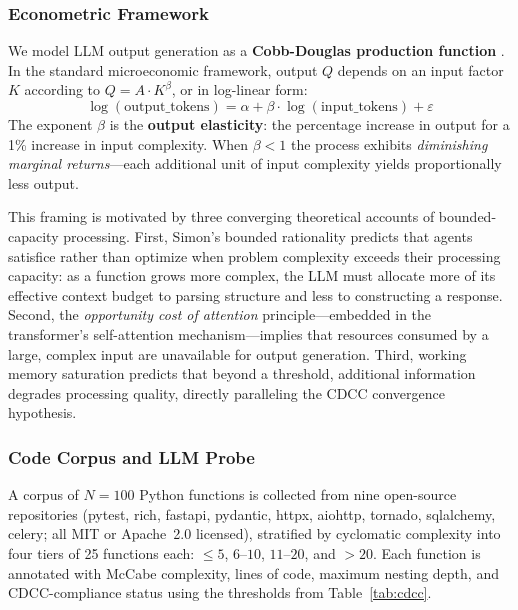 \documentclass[11pt,a4paper]{article}
\begin{document}
\subsubsection{Econometric Framework}

We model LLM output generation as a \textbf{Cobb-Douglas production function}
\citep{varian1992}. In the standard microeconomic framework, output $Q$
depends on an input factor $K$ according to $Q = A \cdot K^{\beta}$,
or in log-linear form:
\begin{equation}
  \log(\mathrm{output\_tokens}) =
    \alpha + \beta \cdot \log(\mathrm{input\_tokens}) + \varepsilon
  \label{eq:loglog}
\end{equation}
The exponent $\beta$ is the \textbf{output elasticity}: the percentage
increase in output for a 1\% increase in input complexity. When $\beta < 1$
the process exhibits \emph{diminishing marginal returns}---each additional
unit of input complexity yields proportionally less output.

This framing is motivated by three converging theoretical accounts of
bounded-capacity processing. First, Simon's bounded rationality
\citep{simon1955} predicts that agents satisfice rather than optimize when
problem complexity exceeds their processing capacity: as a function grows
more complex, the LLM must allocate more of its effective context budget to
parsing structure and less to constructing a response. Second, the
\emph{opportunity cost of attention} principle---embedded in the
transformer's self-attention mechanism---implies that resources consumed
by a large, complex input are unavailable for output generation.
Third, working memory saturation \citep{miller1956,cowan2001} predicts that
beyond a threshold, additional information degrades processing quality,
directly paralleling the CDCC convergence hypothesis.

\subsubsection{Code Corpus and LLM Probe}

A corpus of $N = 100$ Python functions is collected from nine open-source
repositories (pytest, rich, fastapi, pydantic, httpx, aiohttp, tornado,
sqlalchemy, celery; all MIT or Apache~2.0 licensed), stratified by cyclomatic
complexity into four tiers of 25 functions each: $\leq 5$, $6$--$10$,
$11$--$20$, and $>20$. Each function is annotated with McCabe complexity,
lines of code, maximum nesting depth, and CDCC-compliance status using the
thresholds from Table~\ref{tab:cdcc}.
\end{document}
